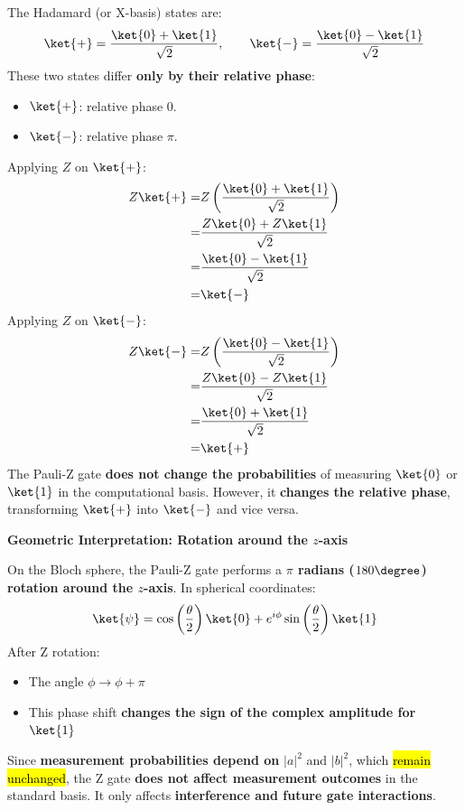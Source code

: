 \begin{examplebox}
    The Hadamard (or X-basis) states are:
    \begin{equation*}
        \ket{+} = \dfrac{\ket{0} + \ket{1}}{\sqrt{2}}, \hspace{2em} \ket{-} = \dfrac{\ket{0} - \ket{1}}{\sqrt{2}}
    \end{equation*}
    These two states differ \textbf{only by their relative phase}:
    \begin{itemize}
        \item $\ket{+}$: relative phase $0$.
        \item $\ket{-}$: relative phase $\pi$.
    \end{itemize}
    Applying $Z$ on $\ket{+}$:
    \begin{align*}
        Z\ket{+} =& Z\left( \dfrac{\ket{0} + \ket{1}}{\sqrt{2}} \right) \\
        =& \dfrac{Z\ket{0} + Z\ket{1}}{\sqrt{2}} \\
        =& \dfrac{\ket{0} - \ket{1}}{\sqrt{2}} \\
        =& \ket{-}
    \end{align*}
    Applying $Z$ on $\ket{-}$:
    \begin{align*}
        Z\ket{-} =& Z\left( \dfrac{\ket{0} - \ket{1}}{\sqrt{2}} \right) \\
        =& \dfrac{Z\ket{0} - Z\ket{1}}{\sqrt{2}} \\
        =& \dfrac{\ket{0} + \ket{1}}{\sqrt{2}} \\
        =& \ket{+}
    \end{align*}
    The Pauli-Z gate \textbf{does not change the probabilities} of measuring $\ket{0}$ or $\ket{1}$ in the computational basis. However, it \textbf{changes the relative phase}, transforming $\ket{+}$ into $\ket{-}$ and vice versa.
\end{examplebox}

\begin{flushleft}
    \textcolor{Green3}{ \textbf{Geometric Interpretation: Rotation around the $z$-axis}}
\end{flushleft}
On the Bloch sphere, the Pauli-Z gate performs a \textbf{$\pi$ radians ($180\degree$) rotation around the $z$-axis}. In spherical coordinates:
\begin{equation*}
    \ket{\psi} = \cos\left(\dfrac{\theta}{2}\right)\ket{0} + e^{i \phi} \sin\left(\dfrac{\theta}{2}\right)\ket{1}
\end{equation*}
After Z rotation:
\begin{itemize}
    \item The angle $\phi \rightarrow \phi + \pi$
    \item This phase shift \textbf{changes the sign of the complex amplitude for} $\ket{1}$
\end{itemize}
Since \textbf{measurement probabilities depend on} $\left|a\right|^{2}$ and $\left|b\right|^{2}$, which \hl{remain unchanged}, the Z gate \textbf{does not affect measurement outcomes} in the standard basis. It only affects \textbf{interference and future gate interactions}.

